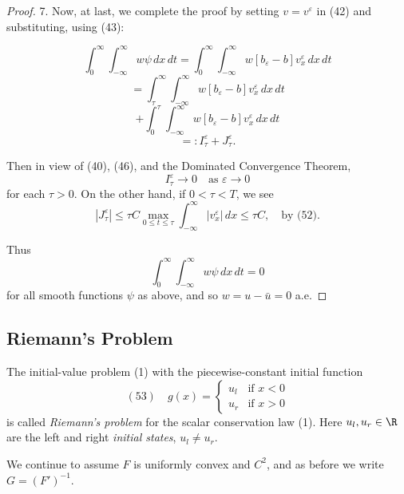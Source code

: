 \begin{proof}
7. Now, at last, we complete the proof by setting $v = v^\varepsilon$ in (42) and substituting, using (43):

$$\int_0^\infty \int_{-\infty}^\infty w\psi \, dx\,dt = \int_0^\infty \int_{-\infty}^\infty w[b_\varepsilon - b]v_x^\varepsilon \, dx\,dt$$
$$= \int_\tau^\infty \int_{-\infty}^\infty w[b_\varepsilon - b]v_x^\varepsilon \, dx\,dt$$
$$+ \int_0^\tau \int_{-\infty}^\infty w[b_\varepsilon - b]v_x^\varepsilon \, dx\,dt$$
$$=: I_\tau^\varepsilon + J_\tau^\varepsilon.$$

Then in view of (40), (46), and the Dominated Convergence Theorem,
$$I_\tau^\varepsilon \to 0 \quad \text{as } \varepsilon \to 0$$
for each $\tau > 0$. On the other hand, if $0 < \tau < T$, we see
$$|J_\tau^\varepsilon| \le \tau C \max_{0 \le t \le \tau} \int_{-\infty}^\infty |v_x^\varepsilon| \, dx \le \tau C, \quad \text{by (52).}$$

Thus
$$\int_0^\infty \int_{-\infty}^\infty w\psi \, dx\,dt = 0$$
for all smooth functions $\psi$ as above, and so $w = u - \bar{u} = 0$ a.e.
\end{proof}

\subsection{Riemann's Problem}
\label{sec:riemann-problem}

The initial-value problem (1) with the piecewise-constant initial function
$$(53) \quad g(x) = \begin{cases} u_l & \text{if } x < 0 \\ u_r & \text{if } x > 0 \end{cases}$$
is called \textit{Riemann's problem} for the scalar conservation law (1). Here $u_l, u_r \in \R$ are the left and right \textit{initial states}, $u_l \ne u_r$.

We continue to assume $F$ is uniformly convex and $C^2$, and as before we write $G = (F')^{-1}$.

